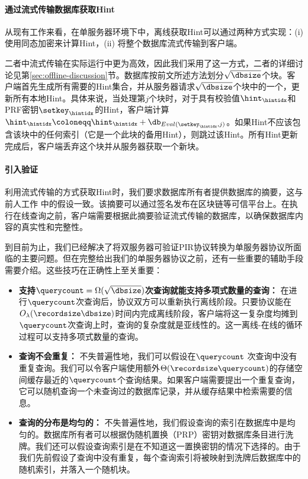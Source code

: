 \paragraph{通过流式传输数据库获取Hint}
从现有工作来看，在单服务器环境下中，离线获取Hint可以通过两种方式实现：(i)  使用同态加密来计算Hint\cite{EC:CorHenKog22}，(ii) 将整个数据库流式传输到客户端\cite{CCS:PatPerYeo18, Piano}。

二者中流式传输在实际运行中更为高效，因此我们采用了这一方式，二者的详细讨论见第\ref{sec:offline-discussion}节。数据库按前文所述方法划分$\sqrt{\dbsize}$个块。客户端首先生成所有需要的Hint集合，并从服务器请求$\sqrt{\dbsize}$个块中的一个，更新所有本地Hint。具体来说，当处理第$j$个块时，对于具有校验值$\hint_\hintidx$和PRF密钥$\setkey_\hintidx$的Hint，客户端计算$\hint_\hintidx \coloneqq \hint_\hintidx+\db_{Eval(\setkey_\hintidx,j)}$。如果Hint不应该包含该块中的任何索引（它是一个此块的备用Hint），则跳过该Hint。所有Hint更新完成后，客户端丢弃这个块并从服务器获取一个新块。

\paragraph{引入验证}
利用流式传输的方式获取Hint时，我们要求数据库所有者提供数据库的摘要，这与前人工作 \cite{APIR} 中的假设一致。该摘要可以通过签名发布在区块链等可信平台上。在执行在线查询之前，客户端需要根据此摘要验证流式传输的数据库，以确保数据库内容的真实性和完整性。

到目前为止，我们已经解决了将双服务器可验证PIR协议转换为单服务器协议所面临的主要问题。但在完整给出我们的单服务器协议之前，还有一些重要的辅助手段需要介绍。这些技巧在正确性上至关重要：
\begin{itemize}
    \item \textbf{支持$\querycount = \Omega(\sqrt{\dbsize})$次查询就能支持多项式数量的查询：} 在进行$\querycount$次查询后，协议双方可以重新执行离线阶段。只要协议能在$O_\lambda(\recordsize\dbsize)$时间内完成离线阶段，客户端将这一复杂度均摊到$\querycount$次查询上时，查询的复杂度就是亚线性的。这一离线-在线的循环过程可以支持多项式数量的查询。

    \item \textbf{查询不会重复：} 不失普遍性地，我们可以假设在$\querycount$ 次查询中没有重复查询。我们可以令客户端使用额外$\Theta(\recordsize \querycount)$的存储空间缓存最近的$\querycount$个查询结果。如果客户端需要提出一个重复查询，它可以随机查询一个未查询过的数据库记录，并从缓存结果中检索需要的信息。

    \item \textbf{查询的分布是均匀的：} 不失普遍性地，我们假设查询的索引在数据库中是均匀的。数据库所有者可以根据伪随机置换（PRP）密钥对数据库条目进行洗牌。我们还可以假设查询索引是在不知道这一置换密钥的情况下选择的。由于我们先前假设了查询中没有重复，每个查询索引将被映射到洗牌后数据库中的随机索引，并落入一个随机块。
\end{itemize}

